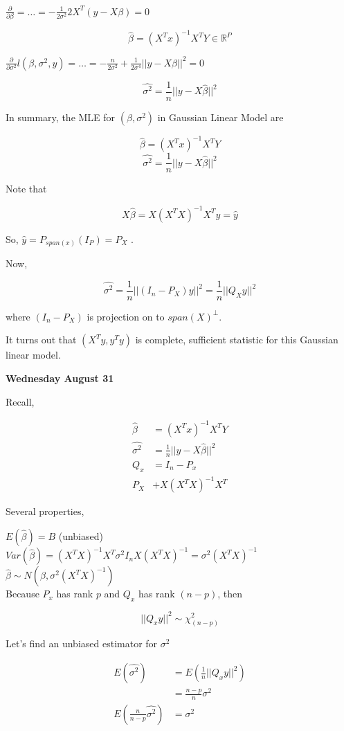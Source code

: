 \documentclass[11pt,fleqn]{book} %
\begin{document}
$\frac{\partial}{\partial \beta} = \dots = -\frac{1}{2 \sigma^2} 2 X^T (y - X\beta) = 0 $

$$\hat{\beta} = (X^T x)^{-1} X^T Y \in \mathbb{R}^P$$

$\frac{\partial}{\partial \sigma^2} l(\beta, \sigma^2, y) = \dots = -\frac{n}{2\sigma^2} + \frac{1}{2 \sigma^4} ||y - X\beta ||^2 = 0 $

$$\hat{\sigma^2} = \frac{1}{n} ||y-X\hat{\beta}||^2 $$

In summary, the MLE for $(\beta, \sigma^2)$ in Gaussian Linear Model are

$$\hat{\beta} = (X^T x)^{-1} X^T Y $$
$$\hat{\sigma^2} = \frac{1}{n} ||y-X\hat{\beta}||^2 $$

Note that 

$$X\hat{\beta} = X(X^T X)^{-1} X^T y = \hat{y}$$

So, $\hat{y} = P_{span(x)} (I_P) = P_X$ .

Now, 

$$\hat{\sigma^2} = \frac{1}{n} ||(I_n - P_X) y||^2 = \frac{1}{n} ||Q_X y ||^2 $$

where $(I_n - P_X)$ is projection on to $span(X)^\perp$.

It turns out that $(X^T y, y^T y)$ is complete, sufficient statistic for this Gaussian linear model. 


\textbf{Wednesday August 31}

Recall,

\begin{align*}
	\hat{\beta} &= (X^T x)^{-1} X^T Y\\
	\hat{\sigma^2} &= \frac{1}{n} ||y-X\hat{\beta}||^2\\
	Q_x &= I_n - P_x\\
	P_X &+ X(X^TX)^{-1}X^T
\end{align*}

Several properties, 

$E(\hat{\beta}) = B$ (unbiased)\\
$Var(\hat{\beta}) = (X^TX)^{-1} X^T \sigma^2 I_n X (X^TX)^{-1} = \sigma^2 (X^TX)^{-1} $\\
$\hat{\beta} \sim N(\beta, \sigma^2 (X^TX)^{-1})$\\

Because $P_x$ has rank $p$ and $Q_x$ has rank $(n-p)$, then

	$$||Q_x y ||^2 \sim \chi^2_{(n-p)} $$

	Let's find an unbiased estimator for $\sigma^2$

	\begin{align*}
		E(\hat{\sigma^2}) &= E(\frac{1}{n}||Q_x y ||^2)\\
			&= \frac{n-p}{n} \sigma^2\\
			E(\frac{n}{n-p} \hat{\sigma^2}) &= \sigma^2\\
	\end{align*}
\end{document}
